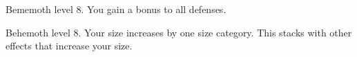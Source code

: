     \featpre Bememoth level 8.
    \featben You gain a  bonus to all defenses.

    \featpre Behemoth level 8.
    \featben Your size increases by one size category.
    This stacks with other effects that increase your size.
